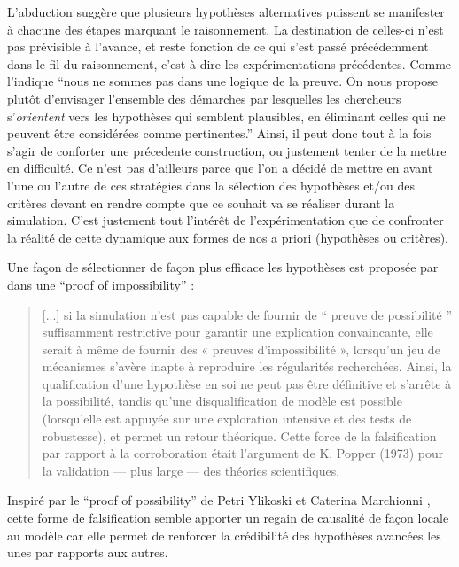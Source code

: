 


L'abduction suggère que plusieurs hypothèses alternatives puissent se manifester à chacune des étapes marquant le raisonnement. La destination de celles-ci n'est pas prévisible à l'avance, et reste fonction de ce qui s'est passé précédemment dans le fil du raisonnement, c'est-à-dire les expérimentations précédentes. Comme l'indique \textcite{Besse2000} \enquote{nous ne sommes pas dans une logique de la preuve. On nous propose plutôt d'envisager l'ensemble des démarches par lesquelles les chercheurs s'\textit{orientent} vers les hypothèses qui semblent plausibles, en éliminant celles qui ne peuvent être considérées comme pertinentes.} Ainsi, il peut donc tout à la fois s'agir de conforter une précedente construction, ou justement tenter de la mettre en difficulté. Ce n'est pas d'ailleurs parce que l'on a décidé de mettre en avant l'une ou l'autre de ces stratégies dans la sélection des hypothèses et/ou des critères devant en rendre compte que ce souhait va se réaliser durant la simulation. C'est justement tout l'intérêt de l'expérimentation que de confronter la réalité de cette dynamique aux formes de nos a priori (hypothèses ou critères).

Une façon de sélectionner de façon plus efficace les hypothèses est proposée par \textcite[300]{Cottineau2014b} dans une \foreignquote{english}{proof of impossibility} :

\blockquote[{\cite[300]{Cottineau2014b}}]{[...] si la simulation n’est pas capable de fournir de \enquote{ preuve de possibilité } suffisamment restrictive pour garantir une explication convaincante, elle serait à même de fournir des « preuves d’impossibilité », lorsqu’un jeu de mécanismes s’avère inapte à reproduire les régularités recherchées. Ainsi, la qualification d’une hypothèse en soi ne peut pas être définitive et s’arrête à la possibilité, tandis qu’une disqualification de modèle est possible (lorsqu’elle est appuyée sur une exploration intensive et des tests de robustesse), et permet un retour théorique. Cette force de la falsification par rapport à la corroboration était l’argument de K. Popper (1973) pour la validation — plus large — des théories scientifiques.}

Inspiré par le \foreignquote{english}{proof of possibility} de Petri Ylikoski et Caterina Marchionni \autocite{Marchionni2013}, cette forme de falsification  semble apporter un regain de causalité de façon locale au modèle car elle permet de renforcer la crédibilité des hypothèses avancées les unes par rapports aux autres.

